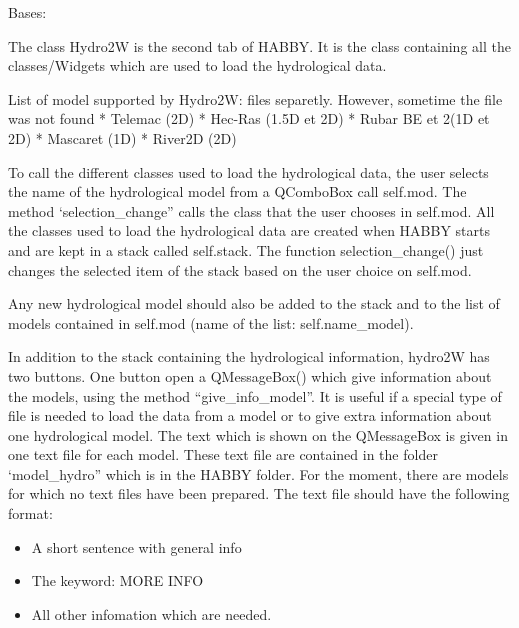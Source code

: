 \documentclass[letterpaper,10pt,english]{sphinxmanual}
\begin{document}
\begin{fulllineitems}
\label{\detokenize{index:src_GUI.hydro_GUI_2.Hydro2W}}
Bases: 

The class Hydro2W is the second tab of HABBY. It is the class containing all the classes/Widgets which are used
to load the hydrological data.

List of model supported by Hydro2W:
files separetly. However, sometime the file was not found
*   Telemac (2D)
*   Hec-Ras (1.5D et 2D)
*   Rubar BE et 2(1D et 2D)
*   Mascaret (1D)
*   River2D (2D)


To call the different classes used to load the hydrological data, the user selects the name of the hydrological
model from a QComboBox call self.mod. The method ‘selection\_change” calls the class that the user chooses in
self.mod. All the classes used to load the
hydrological data are created when HABBY starts and are kept in a stack called self.stack. The function
selection\_change() just changes the selected item of the stack based on the user choice on self.mod.

Any new hydrological model should also be added to the stack and to the list of models contained in self.mod
(name of the list: self.name\_model).

In addition to the stack containing the hydrological information, hydro2W has two buttons. One button open
a QMessageBox() which give information about the models, using the method “give\_info\_model”.  It is useful if a
special type of file is needed to load the data from a model or to give extra information about one hydrological
model. The text which is shown on the QMessageBox is given in one text file for each model.
These text file are contained in the folder ‘model\_hydro” which is in the HABBY folder. For the moment,
there are models for which no text files have been prepared. The text file should have the following format:
\begin{itemize}
\item {} 
A short sentence with general info

\item {} 
The keyword:  MORE INFO

\item {} 
All other infomation which are needed.


\end{itemize}
\end{fulllineitems}
\end{document}
